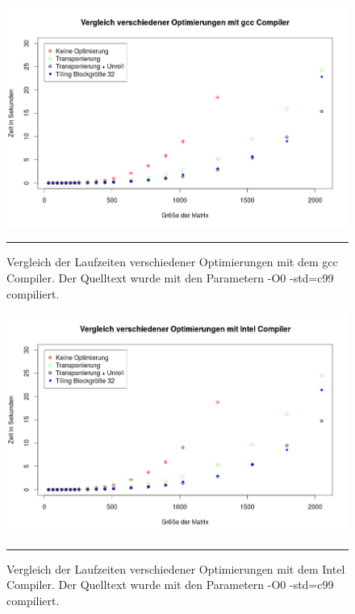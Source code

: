 \begin{figure}[h]
\includegraphics[scale = 0.45]{Bilder/gccO0.png}
\caption{Vergleich der Laufzeiten verschiedener Optimierungen mit dem gcc Compiler. Der Quelltext wurde mit den Parametern -O0 -std=c99 compiliert.}
\noindent\rule{14cm}{0.4pt}
\label{gcc0}
\end{figure}

\begin{figure}[h]
\includegraphics[scale = 0.45]{Bilder/iccO0.png}
\caption{Vergleich der Laufzeiten verschiedener Optimierungen mit dem Intel Compiler. Der Quelltext wurde mit den Parametern -O0 -std=c99 compiliert.}
\noindent\rule{14cm}{0.4pt}
\label{icc0}
\end{figure}

